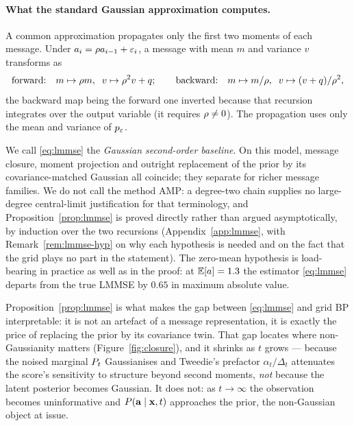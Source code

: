 \documentclass{article}
\theoremstyle{definition}
\theoremstyle{plain}
\begin{document}
\paragraph{What the standard Gaussian approximation computes.} A common approximation propagates
only the first two moments of each message. Under $a_i = \rho a_{i-1} + \varepsilon_i$, a message
with mean $m$ and variance $v$ transforms as
\begin{equation}
\label{eq:closure}
\text{forward:}\quad m \mapsto \rho m,\;\; v \mapsto \rho^2 v + q ;
\qquad
\text{backward:}\quad m \mapsto m/\rho,\;\; v \mapsto (v+q)/\rho^2 ,
\end{equation}
the backward map being the forward one inverted because that recursion integrates over the output
variable (it requires $\rho\neq0$). The propagation uses only the mean and variance of $p_{\varepsilon}$.



We call \eqref{eq:lmmse} the \emph{Gaussian second-order baseline}. On this model, message
closure, moment projection and outright replacement of the prior by its covariance-matched
Gaussian all coincide; they separate for richer message families. We do not call the method AMP: a
degree-two chain supplies no large-degree central-limit justification for that terminology, and
Proposition~\ref{prop:lmmse} is proved directly rather than argued asymptotically, by induction
over the two recursions (Appendix~\ref{app:lmmse}, with Remark~\ref{rem:lmmse-hyp} on why each
hypothesis is needed and on the fact that the grid plays no part in the statement). The zero-mean
hypothesis is load-bearing in practice as well as in the proof: at $\mathbb{E}[a]=1.3$ the estimator
\eqref{eq:lmmse} departs from the true LMMSE by $0.65$ in maximum absolute value.

Proposition~\ref{prop:lmmse} is what makes the gap between \eqref{eq:lmmse} and grid BP
interpretable: it is not an artefact of a message representation, it is exactly the price of
replacing the prior by its covariance twin. That gap locates where non-Gaussianity matters
(Figure~\ref{fig:closure}), and it shrinks as $t$ grows --- because the noised marginal $P_t$
Gaussianises and Tweedie's prefactor $\alpha_t/\Delta_t$ attenuates the score's sensitivity to
structure beyond second moments, \emph{not} because the latent posterior becomes Gaussian. It does
not: as $t\to\infty$ the observation becomes uninformative and $P(\mathbf{a}\mid\mathbf{x},t)$ approaches the
prior, the non-Gaussian object at issue.
\end{document}
